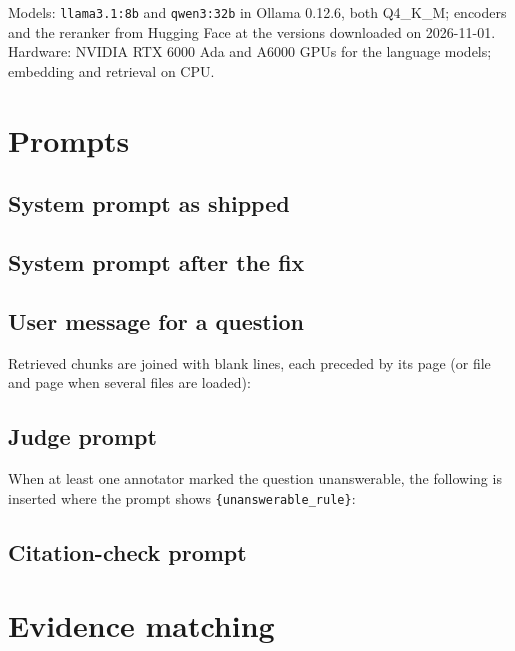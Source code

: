 \documentclass[11pt]{article}
\begin{document}
Models: \texttt{llama3.1:8b} and \texttt{qwen3:32b} in Ollama 0.12.6, both Q4\_K\_M; encoders and
the reranker from Hugging Face at the versions downloaded on 2026-11-01. Hardware: NVIDIA RTX
6000 Ada and A6000 GPUs for the language models; embedding and retrieval on CPU.

\section{Prompts}
\label{si:prompts}

\subsection{System prompt as shipped}


\subsection{System prompt after the fix}


\subsection{User message for a question}
Retrieved chunks are joined with blank lines, each preceded by its page (or file and page when
several files are loaded):


\subsection{Judge prompt}

When at least one annotator marked the question unanswerable, the following is inserted where
the prompt shows \texttt{\{unanswerable\_rule\}}:


\subsection{Citation-check prompt}


\section{Evidence matching}
\label{si:matching}
\end{document}
